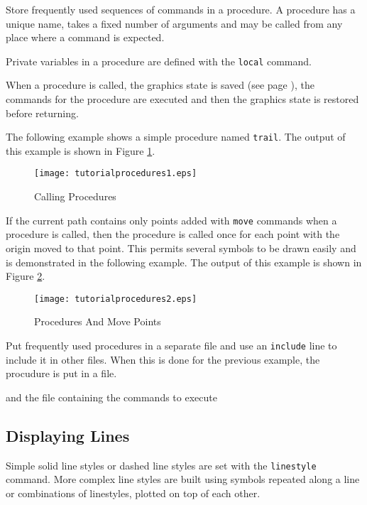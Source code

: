 Store frequently used sequences of commands in a procedure.
A procedure has a unique name, takes a fixed number of arguments and
may be called from any place where a command is expected.

Private variables in a procedure are defined with the 
\texttt{local} command.

When a procedure is called, the graphics state
is saved (see page \pageref{graphicsstate}),
the commands for the procedure are executed and then the
graphics state is restored before returning.

The following example shows a simple procedure named \texttt{trail}.
The output of this example is shown in Figure \ref{tutorialprocedures1}.



\begin{figure}[htb]
\texttt{[image: tutorialprocedures1.eps]}
\caption{Calling Procedures}
\label{tutorialprocedures1}
\end{figure}

If the current path contains only points added with \texttt{move}
commands when a procedure is called, then the
procedure is called once for each point with the origin
moved to that point.  This permits several symbols to be drawn
easily and is demonstrated in the following example.  The 
output of this example is shown in Figure \ref{tutorialprocedures2}.



\begin{figure}[htb]
\texttt{[image: tutorialprocedures2.eps]}
\caption{Procedures And Move Points}
\label{tutorialprocedures2}
\end{figure}


Put frequently used procedures in a separate file and use an
\texttt{include}
line to include it in other files.  When this is done for the
previous example, the procudure is put in a file.



and the file containing the commands to execute



\subsection{Displaying Lines}

Simple solid line styles or dashed line styles
are set with the
\texttt{linestyle} command.  More complex line styles are built using
symbols repeated along a line or combinations of linestyles, plotted
on top of each other.

